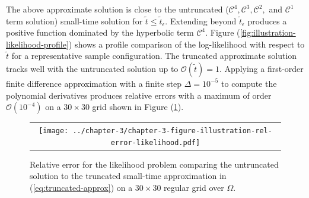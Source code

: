 The above approximate solution is close to the untruncated
($\mathcal{C}^4, \mathcal{C}^3, \mathcal{C}^2,$ and $\mathcal{C}^1$
term solution) small-time solution for
$\tilde{t} \leq \tilde{t}_\epsilon$. Extending beyond
$\tilde{t}_\epsilon$ produces a positive function dominated by the
hyperbolic term $\mathcal{C}^4$. Figure
(\ref{fig:illustration-likelihood-profile}) shows a profile comparison
of the log-likelihood with respect to $\tilde{t}$ for a representative sample
configuration. The truncated approximate solution tracks
well with the untruncated solution up to $\mathcal{O}(\tilde{t}) =
1$. Applying a first-order finite difference approximation with a
finite step $\Delta = 10^{-5}$ to compute the polynomial derivatives
produces relative errors with a maximum of order
$\mathcal{O}(10^{-4})$ on a $30 \times 30$ grid shown in Figure
(\ref{fig:illustration-rel-error-likelihood}).
\begin{figure}
  \centering
  \begin{tabular}{c}
    \begin{minipage}{0.90\textwidth}
      \centering
      \texttt{[image: ../chapter-3/chapter-3-figure-illustration-rel-error-likelihood.pdf]}
      \caption{Relative error for the likelihood problem comparing the
        untruncated solution to the truncated small-time approximation in
        (\ref{eq:truncated-approx}) on a $30 \times 30$ regular grid
        over $\Omega$. }
      \label{fig:illustration-rel-error-likelihood}
    \end{minipage}
    \end{tabular}
\end{figure}



